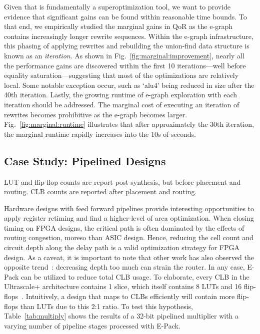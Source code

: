 Given that \shortname{} is fundamentally a superoptimization tool, we want to
provide evidence that significant gains can be found within reasonable time
bounds. To that end, we empirically studied the marginal gains in QoR as the
e-graph contains increasingly longer rewrite sequences. Within the e-graph
infrastructure, this phasing of applying rewrites and rebuilding the union-find
data structure is known as an \textit{iteration}. As shown in
Fig.~\ref{fig:marginal:improvement}, nearly all the performance gains are
discovered within the first 10 iterations---well before equality
saturation---suggesting that most of the optimizations are relatively local.
Some notable exception occur, such as `alu4' being reduced in size after the
40th iteration. Lastly, the growing runtime of e-graph exploration with each
iteration should be addressed. The marginal cost of executing an iteration of
rewrites becomes prohibitive as the e-graph becomes larger.
Fig.~\ref{fig:marginal:runtime} illustrates that after approximately the 30th
iteration, the marginal runtime rapidly increases into the 10s of seconds.

\subsection{Case Study: Pipelined Designs}\label{sec:results:retiming}
\begin{table}[t]
    \centering
    \caption{LUT and flip-flop counts are report post-synthesis, but before placement and routing. CLB counts are reported after placement and routing.}\label{tab:multiply}
\end{table}

Hardware designs with feed forward pipelines provide interesting opportunities
to apply register retiming and find a higher-level of area optimization. When
closing timing on FPGA designs, the critical path is often dominated by the
effects of routing congestion, moreso than ASIC design. Hence, reducing the
cell count and circuit depth along the delay path is a valid optimization
strategy for FPGA design. As a caveat, it is important to note that other work
has also observed the opposite trend~\cite{academicfpga}: decreasing depth too
much can strain the router. In any case, E-Pack can be utilized to reduce total
CLB usage. To elaborate, every CLB in the Ultrascale+ architecture contains 1
slice, which itself contains 8 LUTs and 16 flip-flops~\cite{ug574}.
Intuitively, a design that maps to CLBs efficiently will contain more
flip-flops than LUTs due to this 2:1 ratio. To test this hypothesis,
Table~\ref{tab:multiply} shows the results of a 32-bit pipelined multiplier
with a varying number of pipeline stages processed with E-Pack.

